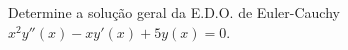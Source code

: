 \linespread{1.5}
Determine a solução geral da E.D.O. de Euler-Cauchy $x^2y''(x) - xy'(x) + 5y(x) = 0$.